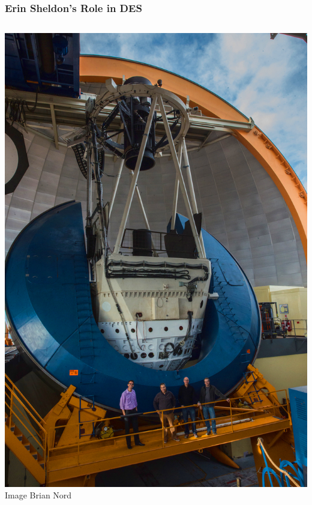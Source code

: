\documentclass[aspectratio=169]{beamer}
\begin{document}


%
\frame
{

    \frametitle{Erin Sheldon's Role in DES}


    \begin{columns}
        \begin{column}{0.5\textwidth}
            \centering
                \includegraphics[height=0.8\textheight]{ctio_blanco_crew_2013Oct-30-small-balance.jpg}
                \newline
                {\tiny Image Brian Nord}
        \end{column}


\end{columns}}
\end{document}
